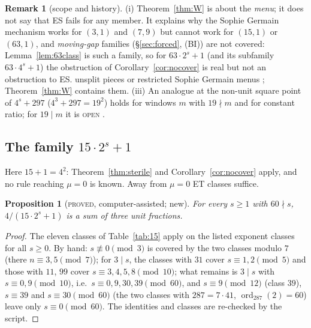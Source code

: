 \documentclass[11pt,reqno]{amsart}
\newtheorem{proposition}[theorem]{Proposition}
\theoremstyle{definition}
\newtheorem{remark}[theorem]{Remark}
\newcommand{\ord}{\operatorname{ord}}
\newcommand{\status}[1]{\textup{\textsc{#1}}}
\begin{document}
\begin{remark}[scope and history]\label{rem:Wscope}
(i) Theorem~\ref{thm:W} is about the \emph{menu}; it does not say that ES
fails for any member.  It explains why the Sophie Germain mechanism works
for $(3,1)$ and $(7,9)$ but cannot work for $(15,1)$ or $(63,1)$, and
\emph{moving-gap} families (\S\ref{sec:forced}, (BI)) are not covered:
Lemma~\ref{lem:63class} is such a family, so for $63\cdot2^s+1$ (and its subfamily $63\cdot4^s+1$) the
obstruction of Corollary~\ref{cor:nocover} is real but not an obstruction
to ES.%
unsplit pieces \cite[Prop.~2.7, Cor.~2.8]{Exp105} or restricted Sophie
Germain menus \cite[Props.~4.1, 4.3]{MenuSterility}; Theorem~\ref{thm:W}
contains them.  (iii) An analogue at the non-unit square point of
$4^s+297$ ($4^3+297=19^2$) holds for windows $m$ with $19\nmid m$ and for
constant ratio; for $19\mid m$ it is \status{open}
\cite[Prop.~4.1]{ExpOpen}.
\end{remark}

\subsection{The family $15\cdot2^s+1$}\label{sec:fifteen}
Here $15+1=4^2$: Theorem~\ref{thm:sterile} and Corollary~\ref{cor:nocover}
apply, and no rule reaching $\mu=0$ is known.  Away from $\mu=0$ ET classes
suffice.

\begin{proposition}[\status{proved}, computer-assisted; new]\label{prop:15half}
For every $s\ge1$ with $60\nmid s$, $4/(15\cdot2^s+1)$ is a sum of three unit
fractions.
\end{proposition}

\begin{proof}
The eleven classes of Table~\ref{tab:15} apply on the listed exponent
classes for all $s\ge0$.  By hand: $s\not\equiv0\pmod3$ is covered by the two
classes modulo $7$ (there $n\equiv3,5\pmod 7$); for $3\mid s$, the classes
with $31$ cover $s\equiv1,2\pmod5$ and those with $11$, $99$ cover
$s\equiv3,4,5,8\pmod{10}$; what remains is $3\mid s$ with
$s\equiv0,9\pmod{10}$, i.e.\ $s\equiv0,9,30,39\pmod{60}$, and $s\equiv9\pmod
{12}$ (class $39$), $s\equiv39$ and $s\equiv30\pmod{60}$ (the two classes with
$287=7\cdot41$, $\ord_{287}(2)=60$) leave only $s\equiv0\pmod{60}$.  The
identities and classes are re-checked by the script.
\end{proof}
\end{document}
